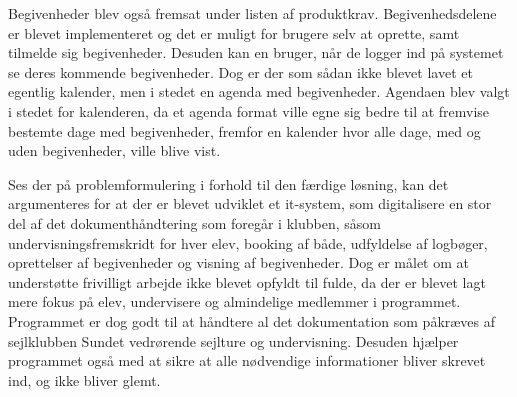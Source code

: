Begivenheder blev også fremsat under listen af produktkrav.
Begivenhedsdelene er blevet implementeret og det er muligt for brugere selv at oprette, samt tilmelde sig begivenheder.
Desuden kan en bruger, når de logger ind på systemet se deres kommende begivenheder.
Dog er der som sådan ikke blevet lavet et egentlig kalender, men i stedet en agenda med begivenheder.
Agendaen blev valgt i stedet for kalenderen, da et agenda format ville egne sig bedre til at fremvise bestemte dage med begivenheder, fremfor en kalender hvor alle dage, med og uden begivenheder, ville blive vist.

Ses der på problemformulering i forhold til den færdige løsning, kan det argumenteres for at der er blevet udviklet et it-system, som digitalisere en stor del af det dokumenthåndtering som foregår i klubben, såsom undervisningsfremskridt for hver elev, booking af både, udfyldelse af logbøger, oprettelser af begivenheder og visning af begivenheder.
Dog er målet om at understøtte frivilligt arbejde ikke blevet opfyldt til fulde, da der er blevet lagt mere fokus på elev, undervisere og almindelige medlemmer i programmet. 
Programmet er dog godt til at håndtere al det dokumentation som påkræves af sejlklubben Sundet vedrørende sejlture og undervisning.
Desuden hjælper programmet også med at sikre at alle nødvendige informationer bliver skrevet ind, og ikke bliver glemt.

\cbend
